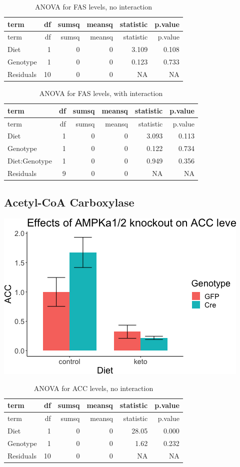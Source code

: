 \documentclass[]{article}
\begin{document}
\begin{longtable}[]{@{}lrrrrr@{}}
\caption{ANOVA for FAS levels, no interaction}\tabularnewline
\toprule
term & df & sumsq & meansq & statistic & p.value\tabularnewline
\midrule
\endfirsthead
\toprule
term & df & sumsq & meansq & statistic & p.value\tabularnewline
\midrule
\endhead
Diet & 1 & 0 & 0 & 3.109 & 0.108\tabularnewline
Genotype & 1 & 0 & 0 & 0.123 & 0.733\tabularnewline
Residuals & 10 & 0 & 0 & NA & NA\tabularnewline
\bottomrule
\end{longtable}

\begin{longtable}[]{@{}lrrrrr@{}}
\caption{ANOVA for FAS levels, with interaction}\tabularnewline
\toprule
term & df & sumsq & meansq & statistic & p.value\tabularnewline
\midrule
\endfirsthead
\toprule
term & df & sumsq & meansq & statistic & p.value\tabularnewline
\midrule
\endhead
Diet & 1 & 0 & 0 & 3.093 & 0.113\tabularnewline
Genotype & 1 & 0 & 0 & 0.122 & 0.734\tabularnewline
Diet:Genotype & 1 & 0 & 0 & 0.949 & 0.356\tabularnewline
Residuals & 9 & 0 & 0 & NA & NA\tabularnewline
\bottomrule
\end{longtable}

\hypertarget{acetyl-coa-carboxylase}{%
\subsection{Acetyl-CoA Carboxylase}\label{acetyl-coa-carboxylase}}

\includegraphics{figures/acc-barplot-1.png}

\begin{longtable}[]{@{}lrrrrr@{}}
\caption{ANOVA for ACC levels, no interaction}\tabularnewline
\toprule
term & df & sumsq & meansq & statistic & p.value\tabularnewline
\midrule
\endfirsthead
\toprule
term & df & sumsq & meansq & statistic & p.value\tabularnewline
\midrule
\endhead
Diet & 1 & 0 & 0 & 28.05 & 0.000\tabularnewline
Genotype & 1 & 0 & 0 & 1.62 & 0.232\tabularnewline
Residuals & 10 & 0 & 0 & NA & NA\tabularnewline
\bottomrule
\end{longtable}
\end{document}
